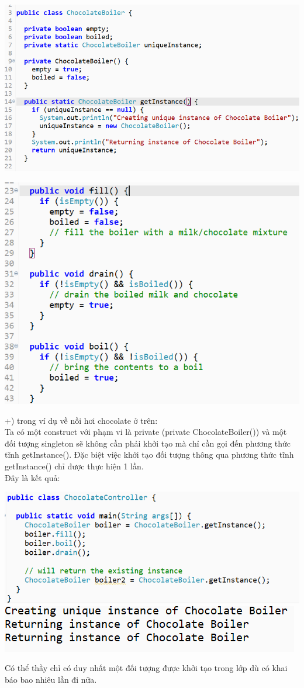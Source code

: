 \begin{multicols}{2}
\includegraphics[height=0.23\textheight]{GALLEYS/images/chapter1/images1s}

\includegraphics[height=0.25\textheight]{GALLEYS/images/chapter1/images1f}
\end{multicols}
+) trong ví dụ về nồi hơi chocolate ở trên:\\
Ta có một construct với phạm vi là private (private ChocolateBoiler()) và một đối tượng singleton sẽ không cần phải khởi tạo mà chỉ cần gọi đến phương thức tĩnh getInstance(). Đặc biệt việc khởi tạo đối tượng thông qua phương thức tĩnh getInstance() chỉ được thực hiện 1 lần.\\
Đây là kết quả:\\
\begin{center}
\includegraphics[scale=0.75]{GALLEYS/images/chapter1/images2}\\
\vspace{1cm}
\includegraphics{GALLEYS/images/chapter1/images3}
\end{center}
Có thể thầy chỉ có duy nhất một đối tượng được khởi tạo trong lớp dù có khai báo bao nhiêu lần đi nữa.




